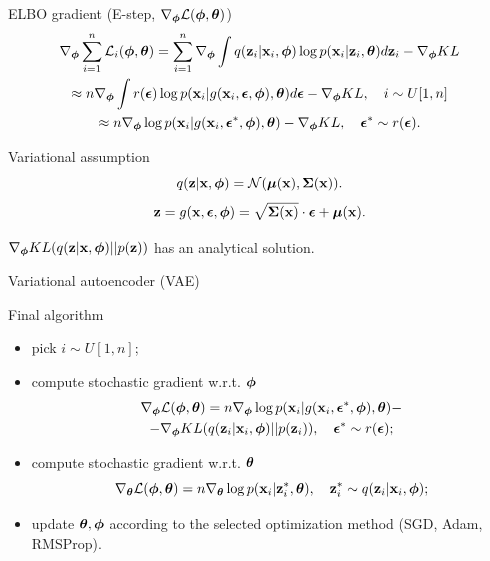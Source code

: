 \begin{frame}{ELBO gradient (E-step, $\nabla_{\boldsymbol{\phi}} \mathcal{L}(\boldsymbol{\phi}, \boldsymbol{\theta})$)}
	\vspace{-0.3cm}
	\begin{multline*}
		\nabla_{\boldsymbol{\phi}} \sum_{i=1}^n \mathcal{L}_i (\boldsymbol{\phi}, \boldsymbol{\theta}) =  \sum_{i=1}^n \nabla_{\boldsymbol{\phi}}\int q(\mathbf{z}_i|\mathbf{x}_i, \boldsymbol{\phi}) \log p(\mathbf{x}_i| \mathbf{z}_i, \boldsymbol{\theta})d\mathbf{z}_i  - \nabla_{\boldsymbol{\phi}} KL \\ \approx  n \nabla_{\boldsymbol{\phi}}\int r(\boldsymbol{\epsilon}) \log p(\mathbf{x}_i| g(\mathbf{x}_i, \boldsymbol{\epsilon}, \boldsymbol{\phi}), \boldsymbol{\theta})d\boldsymbol{\epsilon}  - \nabla_{\boldsymbol{\phi}} KL,\quad i \sim U[1, n]   \\ \approx
		n \nabla_{\boldsymbol{\phi}} \log p(\mathbf{x}_i| g(\mathbf{x}_i, \boldsymbol{\epsilon}^*, \boldsymbol{\phi}), \boldsymbol{\theta})  - \nabla_{\boldsymbol{\phi}} KL , \quad \boldsymbol{\epsilon}^* \sim r(\boldsymbol{\epsilon}).
	\end{multline*}
	
	\begin{block}{Variational assumption}
		\[
		q(\mathbf{z}| \mathbf{x}, \boldsymbol{\phi}) = \mathcal{N} (\boldsymbol{\mu}(\mathbf{x}), \boldsymbol{\Sigma}(\mathbf{x})).
		\]
		\[
		\mathbf{z} = g(\mathbf{x}, \boldsymbol{\epsilon}, \boldsymbol{\phi}) = \sqrt{\boldsymbol{\Sigma}(\mathbf{x})} \cdot \boldsymbol{\epsilon} + \boldsymbol{\mu}(\mathbf{x}).
		\]
	\end{block}
	$\nabla_{\boldsymbol{\phi}} KL (q(\mathbf{z} | \mathbf{x}, \boldsymbol{\phi}) || p(\mathbf{z}))$ has an analytical solution.
\end{frame}
\begin{frame}{Variational autoencoder (VAE)}
	\begin{block}{Final algorithm}
		\begin{itemize}
			\item pick $i \sim U[1, n]$;
			\item compute stochastic gradient w.r.t. $\boldsymbol{\phi}$
			\begin{multline*}
				\nabla_{\boldsymbol{\phi}} \mathcal{L} (\boldsymbol{\phi}, \boldsymbol{\theta}) = n \nabla_{\boldsymbol{\phi}} \log p(\mathbf{x}_i | g(\mathbf{x}_i, \boldsymbol{\epsilon}^*, \boldsymbol{\phi}), \boldsymbol{\theta}) - \\ - \nabla_{\boldsymbol{\phi}} KL (q(\mathbf{z}_i|\mathbf{x}_i, \boldsymbol{\phi}) || p(\mathbf{z}_i)), \quad \boldsymbol{\epsilon}^* \sim r(\boldsymbol{\epsilon});
			\end{multline*}
			\item compute stochastic gradient w.r.t. $\boldsymbol{\theta}$
			\[
			\nabla_{\boldsymbol{\theta}} \mathcal{L} (\boldsymbol{\phi}, \boldsymbol{\theta}) = n \nabla_{\boldsymbol{\theta}} \log p(\mathbf{x}_i|\mathbf{z}^*_i, \boldsymbol{\theta}), \quad \mathbf{z}^*_i \sim q(\mathbf{z}_i|\mathbf{x}_i, \boldsymbol{\phi});
			\]
			\item update $\boldsymbol{\theta}, \boldsymbol{\phi}$ according to the selected optimization method (SGD, Adam, RMSProp).
		\end{itemize}
	\end{block}
\end{frame}
